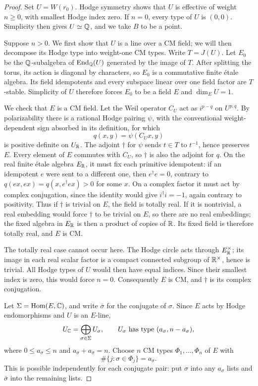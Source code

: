 \begin{proof}
Set \(U=W(r_0)\). Hodge symmetry shows that \(U\) is effective of
weight \(n\ge0\), with smallest Hodge index zero. If \(n=0\), every
type of \(U\) is \((0,0)\). Simplicity then gives \(U\simeq\mathbb{Q}\), and
we take \(B\) to be a point.

Suppose \(n>0\).  We first show that \(U\) is a line over a CM field;
we will then decompose its Hodge type into weight-one CM types.
Write \(T=J(U)\). Let \(E_0\) be the
\(\mathbb{Q}\)-subalgebra of \(\operatorname{End}_{\mathbb{Q}}(U)\) generated by the image of \(T\).
After splitting the torus, its action is diagonal by characters, so
\(E_0\) is a commutative finite étale algebra. Its field idempotents
and every subspace linear over one field factor are \(T\)-stable.
Simplicity of \(U\) therefore forces \(E_0\) to be a field \(E\) and
\(\dim_E U=1\).

We check that \(E\) is a CM field. Let the Weil operator \(C_U\) act
as \(i^{p-q}\) on \(U^{p,q}\). By polarizability there is a rational
Hodge pairing \(\psi\), with the conventional weight-dependent sign
absorbed in its definition, for which
\[
 q(x,y)=\psi(C_Ux,y)
\]
is positive definite on \(U_{\mathbb{R}}\). The adjoint \(\dagger\) for
\(\psi\) sends \(t\in T\) to \(t^{-1}\), hence preserves \(E\).
Every element of \(E\) commutes with \(C_U\), so \(\dagger\) is also
the adjoint for \(q\). On the real finite étale algebra \(E_{\mathbb{R}}\), it
must fix each primitive idempotent: if an idempotent \(e\) were sent
to a different one, then \(e^\dagger e=0\), contrary to
\(q(ex,ex)=q(x,e^\dagger ex)>0\) for some \(x\). On a complex factor
it must act by complex conjugation, since the identity would give
\(i^\dagger i=-1\), again contrary to positivity. Thus if
\(\dagger\) is trivial on \(E\), the field is totally real. If it is
nontrivial, a real embedding would force \(\dagger\) to be trivial
on \(E\), so there are no real embeddings; the fixed algebra in
\(E_{\mathbb{R}}\) is then a product of copies of \(\mathbb{R}\). Its fixed field is
therefore totally real, and \(E\) is CM.

The totally real case cannot occur here. The Hodge circle acts
through \(E_{\mathbb{R}}^\times\); its image in each real scalar factor is a
compact connected subgroup of \(\mathbb{R}^\times\), hence is trivial.
All Hodge types of \(U\) would then have equal indices. Since their
smallest index is zero, this would force \(n=0\). Consequently \(E\)
is CM, and \(\dagger\) is its complex conjugation.

Let \(\Sigma=\operatorname{Hom}(E,\mathbb{C})\), and write \(\bar\sigma\) for the conjugate
of \(\sigma\). Since \(E\) acts by Hodge endomorphisms and \(U\) is an
\(E\)-line,
\[
 U_{\mathbb{C}}=\bigoplus_{\sigma\in\Sigma}U_\sigma,\qquad
 U_\sigma\text{ has type }(a_\sigma,n-a_\sigma),
\]
where \(0\le a_\sigma\le n\) and
\(a_\sigma+a_{\bar\sigma}=n\). Choose \(n\) CM types
\(\Phi_1,\ldots,\Phi_n\) of \(E\) with
\[
 \#\{j:\sigma\in\Phi_j\}=a_\sigma.
\]
This is possible independently for each conjugate pair: put
\(\sigma\) into any \(a_\sigma\) lists and \(\bar\sigma\) into the
remaining lists.


\end{proof}
